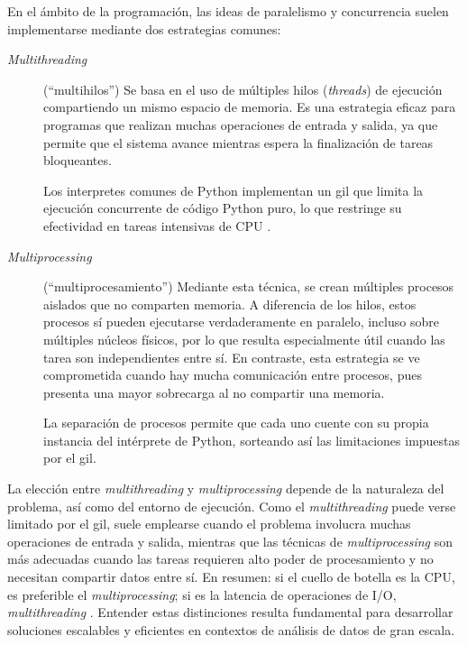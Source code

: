 En el ámbito de la programación, las ideas de paralelismo y concurrencia suelen implementarse mediante dos estrategias comunes:

\begin{description}
    \item[\emph{Multithreading}] (``multihilos'') 
    Se basa en el uso de múltiples hilos (\emph{threads}) de ejecución compartiendo un mismo espacio de memoria. Es una estrategia eficaz para programas que realizan muchas operaciones de entrada y salida, ya que permite que el sistema avance mientras espera la finalización de tareas bloqueantes.
    
    Los interpretes comunes de Python implementan un \gls{gil} que limita la ejecución concurrente de código Python puro, lo que restringe su efectividad en tareas intensivas de CPU \citep{piñeiro2024omp4pypurepythonimplementation}.

    \item[\emph{Multiprocessing}] (``multiprocesamiento'')
    Mediante esta técnica, se crean múltiples procesos aislados que no comparten memoria. A diferencia de los hilos, estos procesos sí pueden ejecutarse verdaderamente en paralelo, incluso sobre múltiples núcleos físicos, por lo que resulta especialmente útil cuando las tarea son independientes entre sí. En contraste, esta estrategia se ve comprometida cuando hay mucha comunicación entre procesos, pues presenta una mayor sobrecarga al no compartir una memoria.
 
    La separación de procesos permite que cada uno cuente con su propia instancia del intérprete de Python, sorteando así las limitaciones impuestas por el \gls{gil}.
\end{description}

La elección entre \emph{multithreading} y \emph{multiprocessing} depende de la naturaleza del problema, así como del entorno de ejecución. Como el \emph{multithreading} puede verse limitado por el \gls{gil}, suele emplearse cuando el problema involucra muchas operaciones de entrada y salida, mientras que las técnicas de \emph{multiprocessing} son más adecuadas cuando las tareas requieren alto poder de procesamiento y no necesitan compartir datos entre sí. En resumen: si el cuello de botella es la CPU, es preferible el \emph{multiprocessing}; si es la latencia de operaciones de I/O, \emph{multithreading} \citep{bienia2008parsec}. Entender estas distinciones resulta fundamental para desarrollar soluciones escalables y eficientes en contextos de análisis de datos de gran escala.


